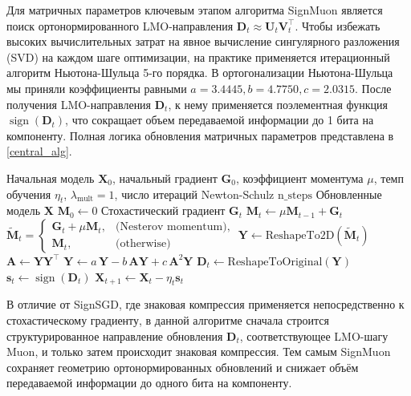 \documentclass{article}
\begin{document}
Для матричных параметров ключевым этапом алгоритма SignMuon является поиск ортонормированного LMO-направления $\mathbf{D}_t \approx \mathbf{U}_t \mathbf{V}_t^\top$. Чтобы избежать высоких вычислительных затрат на явное вычисление сингулярного разложения (SVD) на каждом шаге оптимизации, на практике применяется итерационный алгоритм Ньютона-Шульца 5-го порядка. В ортогонализации Ньютона-Шульца мы приняли коэффициенты равными $a=3.4445, b=4.7750, c=2.0315$. После получения LMO-направления $\mathbf{D}_t$, к нему применяется поэлементная функция $\operatorname{sign}(\mathbf{D}_t)$, что сокращает объем передаваемой информации до 1 бита на компоненту. Полная логика обновления матричных параметров представлена в \cref{central_alg}.
\begin{algorithm}
\caption{SignMuon}
\begin{algorithmic}[1]
\Require Начальная модель $\mathbf{X}_0$, начальный градиент $\mathbf{G}_0$, коэффициент моментума $\mu$, темп обучения $\eta_t$, $\lambda_{\mathrm{mult}}=1$, число итераций Newton-Schulz $\mathrm{n\_steps}$
\Ensure Обновленные модель $\mathbf{X}$
\State $\mathbf{M}_0 \gets 0$ 
    \State Стохастический градиент $\mathbf{G}_t$
    \State $\mathbf{M}_t \gets \mu \mathbf{M}_{t-1} + \mathbf{G}_t$ 
    \State $\tilde{\mathbf{M}}_t =
    \begin{cases} 
        \mathbf{G}_t + \mu \mathbf{M}_t, & \text{(Nesterov momentum)}, \\
        \mathbf{M}_t, & \text{(otherwise)}
    \end{cases}$
    \State $\mathbf{Y} \gets \text{ReshapeTo2D}(\tilde{\mathbf{M}}_t)$ 
     
        \State $\mathbf{A} \gets \mathbf{Y} \mathbf{Y}^\top$
        \State $\mathbf{Y} \gets a\,\mathbf{Y} - b\,\mathbf{A}\mathbf{Y} + c\,\mathbf{A}^2\mathbf{Y}$
    \EndFor
    \State $\mathbf{D}_t \gets \text{ReshapeToOriginal}(\mathbf{Y})$ 
    \State $\mathbf{s}_t \gets \operatorname{sign}(\mathbf{D}_t)$ 
    \State $\mathbf{X}_{t+1} \gets \mathbf{X}_t - \eta_t \mathbf{s}_t$ 
\EndFor
\label{central_alg}
\end{algorithmic}
\end{algorithm}

В отличие от SignSGD, где знаковая компрессия применяется непосредственно к стохастическому градиенту, в данной алгоритме сначала строится структурированное направление обновления $\mathbf{D}_t$, соответствующее LMO-шагу Muon, и только затем происходит знаковая компрессия. Тем самым SignMuon сохраняет геометрию ортонормированных обновлений и снижает объём передаваемой информации до одного бита на компоненту.
\end{document}
